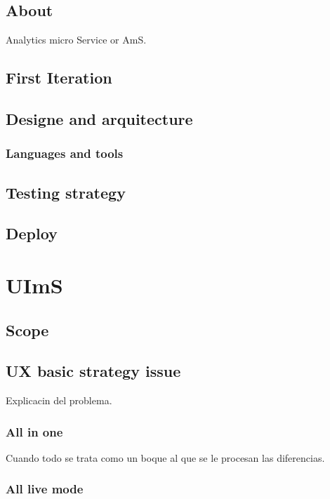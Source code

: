 \documentclass[oneside,english,titlepage]{scrbook}
\begin{document}
\subsection{About}

Analytics micro Service or AmS.

\subsection{First Iteration}

\subsection{Designe and arquitecture}



\subsubsection{Languages and tools}

\subsection{Testing strategy}

\subsection{Deploy}

\section{UImS}

\subsection{Scope}

\subsection{UX basic strategy issue}

Explicacin del problema.

\subsubsection{All in one}

Cuando todo se trata como un boque al que se le procesan las diferencias.

\subsubsection{All live mode}
\end{document}
